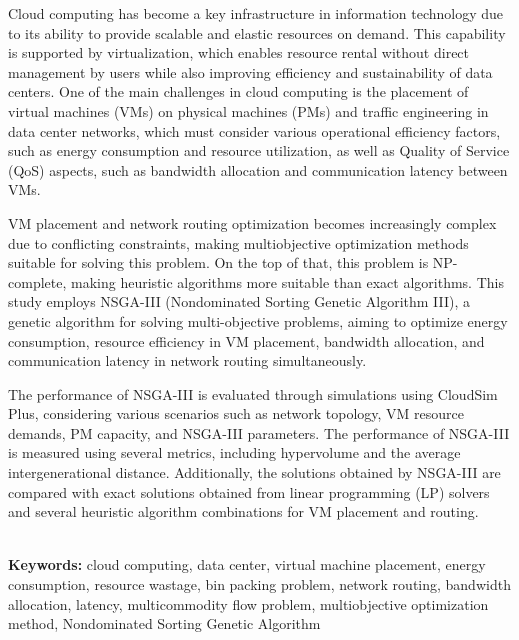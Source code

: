 Cloud computing has become a key infrastructure in information technology due to its ability to provide scalable and elastic resources on demand. This capability is supported by virtualization, which enables resource rental without direct management by users while also improving efficiency and sustainability of data centers. One of the main challenges in cloud computing is the placement of virtual machines (VMs) on physical machines (PMs) and traffic engineering in data center networks, which must consider various operational efficiency factors, such as energy consumption and resource utilization, as well as Quality of Service (QoS) aspects, such as bandwidth allocation and communication latency between VMs. 

VM placement and network routing optimization becomes increasingly complex due to conflicting constraints, making multiobjective optimization methods suitable for solving this problem. On the top of that, this problem is NP-complete, making heuristic algorithms more suitable than exact algorithms. This study employs NSGA-III (Nondominated Sorting Genetic Algorithm III), a genetic algorithm for solving multi-objective problems, aiming to optimize energy consumption, resource efficiency in VM placement, bandwidth allocation, and communication latency in network routing simultaneously.

The performance of NSGA-III is evaluated through simulations using CloudSim Plus, considering various scenarios such as network topology, VM resource demands, PM capacity, and NSGA-III parameters. The performance of NSGA-III is measured using several metrics, including hypervolume and the average intergenerational distance. Additionally, the solutions obtained by NSGA-III are compared with exact solutions obtained from linear programming (LP) solvers and several heuristic algorithm combinations for VM placement and routing.

\\
\textbf{Keywords: }cloud computing, data center, virtual machine placement, energy consumption, resource wastage, bin packing problem, network routing, bandwidth allocation, latency, multicommodity flow problem, multiobjective optimization method, Nondominated Sorting Genetic Algorithm
